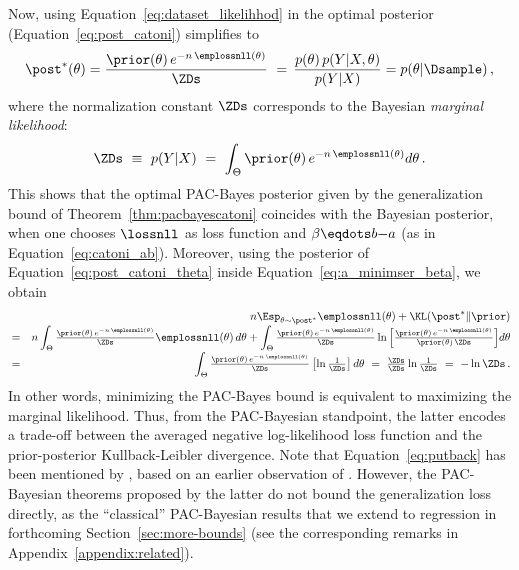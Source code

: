 \documentclass{article}
\theoremstyle{definition}
\theoremstyle{plain}
\begin{document}
Now, using Equation~\eqref{eq:dataset_likelihhod} in the optimal posterior (Equation~\ref{eq:post_catoni}) simplifies to
\begin{eqnarray} \label{eq:post_catoni_theta} 
\post^*(\theta)
=
\frac{\prior(\theta) \,e^{-n\,\emplossnll(\theta)}}{\ZDs}\,
\,=\,  
\frac{p(\theta)\,p(Y|X,\theta)}{p(Y|X)}
 = 
p(\theta|\Dsample)\,,
\end{eqnarray}
%
where the normalization constant $\ZDs$ corresponds to the Bayesian \emph{marginal likelihood}:
\begin{equation} \label{eq:post_catoni_Zb} 
\ZDs \ \equiv \ p(Y|X) \ = \ 
\int_{\Theta}\prior(\theta) \,e^{-n\,\emplossnll(\theta)} d \theta\,.
\end{equation}
This shows that the optimal PAC-Bayes posterior given by the generalization bound of Theorem~\ref{thm:pacbayescatoni} coincides with the Bayesian posterior, when one chooses $\lossnll$ as loss function and $\beta\eqdots b{-}a$ (as in Equation~\ref{eq:catoni_ab}).
%
Moreover, using the posterior of Equation~\eqref{eq:post_catoni_theta} inside Equation~\eqref{eq:a_minimser_beta}, we obtain
%
%
\begin{eqnarray} \label{eq:putback} 
& & \hspace{-.8cm} n \Esp_{\theta\sim\post^*} \emplossnll(\theta)  +  \KL(\post^*\|\prior)\\[-1mm]
&=& \nonumber
n  \int_\Theta \tfrac{\prior(\theta) \,e^{-n\,\emplossnll(\theta)}}{\ZDs} \emplossnll(\theta)\, d\theta
+  \int_\Theta \tfrac{\prior(\theta) \,e^{-n\,\emplossnll(\theta)}}{\ZDs} 
\ln \Big[ \tfrac{\prior(\theta) \,e^{-n\,\emplossnll(\theta)}}{\prior(\theta)\, \ZDs} %
\Big]
 d\theta\\[-1mm]
%
%
%
%
%
&=& \nonumber
\int_\Theta \tfrac{\prior(\theta) \,e^{-n\,\emplossnll(\theta)}}{\ZDs} 
\left[\ln\tfrac1{\ZDs}\right]
 d\theta
%
\ = \ \tfrac{\ZDs}{\ZDs}  \ln\tfrac1{\ZDs} \ = \ -\ln{\ZDs}\,.
\end{eqnarray}
In other words, minimizing the PAC-Bayes bound is equivalent to maximizing the marginal likelihood.
Thus, from the PAC-Bayesian standpoint, the latter encodes  a trade-off between the averaged negative log-likelihood loss function and the prior-posterior Kullback-Leibler divergence.
%
%
Note that Equation~\eqref{eq:putback} has been mentioned by \citet{grunwald-2012}, based on an earlier observation of \citet{zhang-06}. However, the PAC-Bayesian theorems proposed by the latter do not bound the generalization loss directly, as the ``classical'' PAC-Bayesian results \cite{catoni-07,mcallester-99,seeger-02} that we extend to regression in forthcoming Section~\ref{sec:more-bounds} (see the corresponding remarks in Appendix~\ref{appendix:related}).
\end{document}
